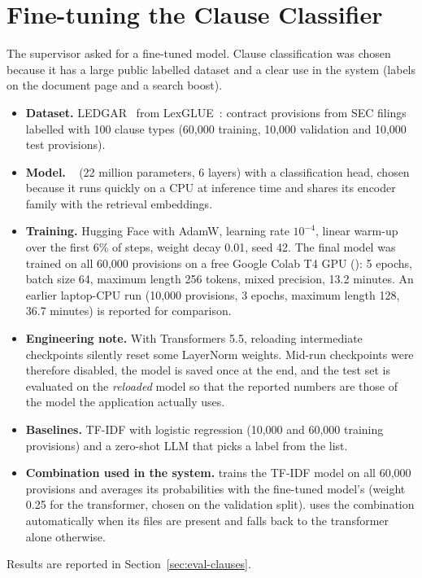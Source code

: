 \section{Fine-tuning the Clause Classifier}\label{sec:finetune}
The supervisor asked for a fine-tuned model. Clause classification was chosen because it has a large
public labelled dataset and a clear use in the system (labels on the document page and a search boost).
\begin{itemize}
\item \textbf{Dataset.} LEDGAR~\cite{tuggener2020ledgar} from LexGLUE~\cite{chalkidis2022lexglue}:
contract provisions from SEC filings labelled with 100 clause types (60,000 training, 10,000
validation and 10,000 test provisions).
\item \textbf{Model.} ~\cite{wang2020minilm} (22 million
parameters, 6 layers) with a classification head, chosen because it runs quickly on a CPU at inference
time and shares its encoder family with the retrieval embeddings.
\item \textbf{Training.} Hugging Face  with AdamW, learning rate $10^{-4}$, linear warm-up over
the first 6\% of steps, weight decay 0.01, seed 42. The final model was trained on all 60,000 provisions on a
free Google Colab T4 GPU (): 5 epochs, batch size 64,
maximum length 256 tokens, mixed precision, 13.2 minutes. An earlier laptop-CPU run (10,000 provisions,
3 epochs, maximum length 128, 36.7 minutes) is reported for comparison.
\item \textbf{Engineering note.} With Transformers 5.5, reloading intermediate checkpoints silently reset
some LayerNorm weights. Mid-run checkpoints were therefore disabled, the model is saved once at the end,
and the test set is evaluated on the \emph{reloaded} model so that the reported numbers are those of the
model the application actually uses.
\item \textbf{Baselines.} TF-IDF with logistic regression (10,000 and 60,000 training provisions) and a
zero-shot LLM that picks a label from the list.
\item \textbf{Combination used in the system.}  trains the TF-IDF model on all
60,000 provisions and averages its probabilities with the fine-tuned model's (weight 0.25 for the transformer,
chosen on the validation split).  uses the combination automatically when its files are
present and falls back to the transformer alone otherwise.
\end{itemize}
Results are reported in Section~\ref{sec:eval-clauses}.


